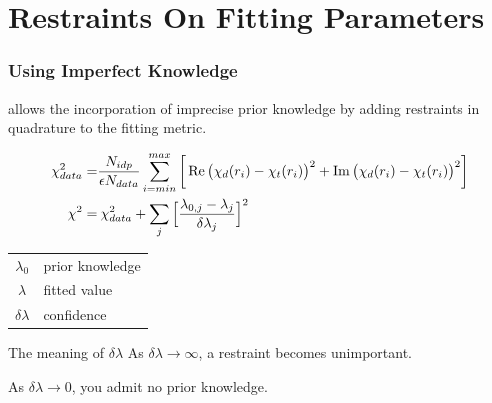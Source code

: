 \documentclass[10pt, xcolor=x11names, compress]{beamer}
\begin{document}
\section[Restraints]{Restraints On Fitting Parameters}
\begin{frame}
  \frametitle{Using Imperfect Knowledge}

  {\ifeffit} allows the incorporation of imprecise
  \alert{prior knowledge} by adding restraints in quadrature
  to the fitting metric.

  {\small
    \begin{align}
      \chi^2_{data} =& \frac{N_{idp}}{\epsilon N_{data}}
                      \sum\limits_{i=min}^{max} 
                        \bigg[\Re\big(\chi_d(r_i)-\chi_t(r_i)\big)^2 + 
                              \Im\big(\chi_d(r_i)-\chi_t(r_i)\big)^2\bigg]
                      \notag \\
     \chi^2 =& \> \chi^2_{data} + \sum\limits_{j}\Big[\frac{\lambda_{0,j} -
       \lambda_j}{\delta\lambda_j}\Big]^2 \label{eq:restraint}
   \end{align}
  }
  \begin{center}
    \begin{tabular}{cl}
      $\lambda_0$     & prior knowledge \\
      $\lambda$       & fitted value    \\
      $\delta\lambda$ & confidence      \\
    \end{tabular}
  \end{center}
  \begin{block}{The meaning of $\delta\lambda$}
      As $\delta\lambda\rightarrow\infty$, a restraint becomes unimportant.

      As $\delta\lambda\rightarrow0$, you admit no prior knowledge.
  \end{block}
\end{frame}
\end{document}
